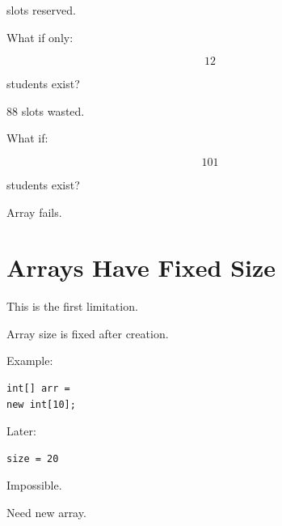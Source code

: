 \documentclass[11pt,a4paper]{book}
\begin{document}
slots reserved.


What if only:

\[
12
\]

students exist?


88 slots wasted.


What if:

\[
101
\]

students exist?


Array fails.


\section{Arrays Have Fixed Size}

This is the first limitation.


\begin{rosettarule}

Array size is fixed after creation.

\end{rosettarule}


Example:

\begin{verbatim} 
int[] arr =
new int[10];
\end{verbatim}


Later:

\begin{verbatim}
size = 20
\end{verbatim}


Impossible.


Need new array.
\end{document}

